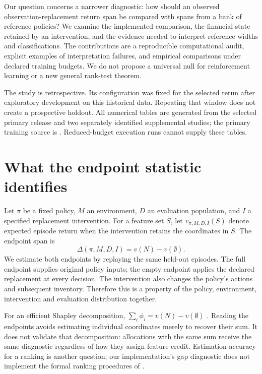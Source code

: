 \documentclass[10pt,twocolumn]{article}
\begin{document}
Our question concerns a narrower diagnostic: how should an observed
observation-replacement return span be compared with spans from a bank of
reference policies? We examine the implemented comparison, the financial state
retained by an intervention, and the evidence needed to interpret reference
widths and classifications. The contributions are a reproducible computational
audit, explicit examples of interpretation failures, and empirical comparisons
under declared training budgets. We do not propose a universal null for
reinforcement learning or a new general rank-test theorem.

The study is retrospective. Its configuration was fixed for the selected
rerun after exploratory development on this historical data. Repeating that
window does not create a prospective holdout. All numerical tables are
generated from the selected primary release and two separately identified
supplemental studies; the primary training source is
\texttt{\TrainingCommit}. Reduced-budget execution runs cannot supply these
tables.

\section{What the endpoint statistic identifies}
Let $\pi$ be a fixed policy, $M$ an environment, $D$ an evaluation population,
and $I$ a specified replacement intervention. For a feature set $S$, let
$v_{\pi,M,D,I}(S)$ denote expected episode return when the intervention retains
the coordinates in $S$. The endpoint span is
\begin{equation}
\Delta(\pi,M,D,I)=v(N)-v(\emptyset).
\label{eq:span}
\end{equation}
We estimate both endpoints by replaying the same held-out episodes. The full
endpoint supplies original policy inputs; the empty endpoint applies the
declared replacement at every decision. The intervention also changes the
policy's actions and subsequent inventory. Therefore this is a property of the
policy, environment, intervention and evaluation distribution together.

For an efficient Shapley decomposition, $\sum_i\phi_i=v(N)-v(\emptyset)$
\citep{lundberg2017}. Reading the endpoints avoids estimating individual
coordinates merely to recover their sum. It does not validate that
decomposition: allocations with the same sum receive the same diagnostic
regardless of how they assign feature credit. Estimation accuracy for a
ranking is another question; our implementation's gap diagnostic does not
implement the formal ranking procedures of \citet{goldwasser2024}.
\end{document}
